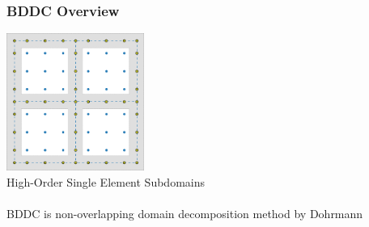 \documentclass{beamer}
\begin{document}
\begin{frame}
\begin{center}
\frametitle{BDDC Overview}

\includegraphics[height=4.5cm]{../img/HighOrderBDDCMeshInterface}\\
{\small High-Order Single Element Subdomains}\\

~\\

BDDC is non-overlapping domain decomposition method by Dohrmann \cite{dohrmann2003preconditioner}\\

\end{center}
\end{frame}

\end{document}
